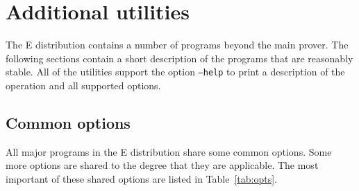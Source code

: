 \documentclass{report}
\begin{document}
\chapter{Additional utilities}

The E distribution contains a number of programs beyond the main
prover. The following sections contain a short description of the
programs that are reasonably stable. All of the utilities support the
option \texttt{--help} to print a description of the operation and all
supported options.

\section{Common options}

All major programs in the E distribution share some common
options. Some more options are shared to the degree that they are
applicable. The most important of these shared options are listed in
Table~\ref{tab:opts}.
\end{document}
